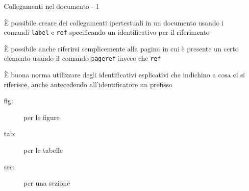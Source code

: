 \begin{frame}{Collegamenti nel documento - 1}

È possibile creare dei collegamenti ipertestuali in un documento usando i 
comandi \texttt{label} e \texttt{ref} specificando un identificativo per il 
riferimento

\vfill

È possibile anche riferirsi semplicemente alla pagina in cui è presente un certo elemento usando il comando \texttt{pageref} invece che \texttt{ref}

\vfill

È buona norma utilizzare degli identificativi esplicativi che indichino a cosa ci si riferisce, anche antecedendo all'identificatore un prefisso
\begin{description}
	\item [fig:] per le figure
	\item [tab:] per le tabelle
	\item [sec:] per una sezione
\end{description}

\end{frame}